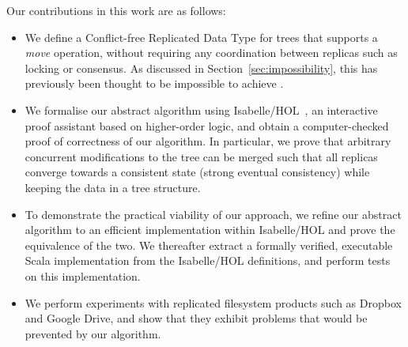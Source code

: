 \documentclass[sigconf]{acmart}
\begin{document}
Our contributions in this work are as follows:
\begin{itemize}
    \item We define a Conflict-free Replicated Data Type for trees that supports a \emph{move} operation, without requiring any coordination between replicas such as locking or consensus.
        As discussed in Section~\ref{sec:impossibility}, this has previously been thought to be impossible to achieve \cite{Najafzadeh:2017vk,Najafzadeh:2018bw}.
    \item We formalise our abstract algorithm using Isabelle/HOL~\cite{DBLP:conf/tphol/WenzelPN08}, an interactive proof assistant based on higher-order logic, and obtain a computer-checked proof of correctness of our algorithm.
        In particular, we prove that arbitrary concurrent modifications to the tree can be merged such that all replicas converge towards a consistent state (strong eventual consistency) while keeping the data in a tree structure.
    \item To demonstrate the practical viability of our approach, we refine our abstract algorithm to an efficient implementation within Isabelle/HOL and prove the equivalence of the two.  We thereafter extract a formally verified, executable Scala implementation from the Isabelle/HOL definitions, and perform tests on this implementation.
    \item We perform experiments with replicated filesystem products such as Dropbox and Google Drive, and show that they exhibit problems that would be prevented by our algorithm.
\end{itemize}
\end{document}
